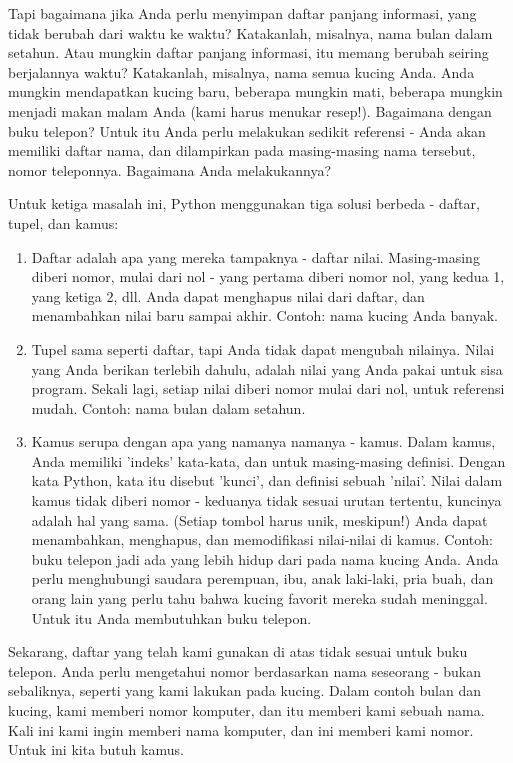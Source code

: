 Tapi bagaimana jika Anda perlu menyimpan daftar panjang informasi, yang tidak berubah dari waktu ke waktu? Katakanlah, misalnya, nama bulan dalam setahun. Atau mungkin daftar panjang informasi, itu memang berubah seiring berjalannya waktu? Katakanlah, misalnya, nama semua kucing Anda. Anda mungkin mendapatkan kucing baru, beberapa mungkin mati, beberapa mungkin menjadi makan malam Anda (kami harus menukar resep!). Bagaimana dengan buku telepon? Untuk itu Anda perlu melakukan sedikit referensi - Anda akan memiliki daftar nama, dan dilampirkan pada masing-masing nama tersebut, nomor teleponnya. Bagaimana Anda melakukannya?

Untuk ketiga masalah ini, Python menggunakan tiga solusi berbeda - daftar, tupel, dan kamus: 
\begin{enumerate}
\item Daftar adalah apa yang mereka tampaknya - daftar nilai. Masing-masing diberi nomor, mulai dari nol - yang pertama diberi nomor nol, yang kedua 1, yang ketiga 2, dll. Anda dapat menghapus nilai dari daftar, dan menambahkan nilai baru sampai akhir. Contoh: nama kucing Anda banyak. 
\item Tupel sama seperti daftar, tapi Anda tidak dapat mengubah nilainya. Nilai yang Anda berikan terlebih dahulu, adalah nilai yang Anda pakai untuk sisa program. Sekali lagi, setiap nilai diberi nomor mulai dari nol, untuk referensi mudah. Contoh: nama bulan dalam setahun. 
\item Kamus serupa dengan apa yang namanya namanya - kamus. Dalam kamus, Anda memiliki 'indeks' kata-kata, dan untuk masing-masing definisi. Dengan kata Python, kata itu disebut 'kunci', dan definisi sebuah 'nilai'. Nilai dalam kamus tidak diberi nomor - keduanya tidak sesuai urutan tertentu, kuncinya adalah hal yang sama. (Setiap tombol harus unik, meskipun!) Anda dapat menambahkan, menghapus, dan memodifikasi nilai-nilai di kamus. Contoh: buku telepon jadi ada yang lebih hidup dari pada nama kucing Anda. Anda perlu menghubungi saudara perempuan, ibu, anak laki-laki, pria buah, dan orang lain yang perlu tahu bahwa kucing favorit mereka sudah meninggal. Untuk itu Anda membutuhkan buku telepon. 
\end{enumerate}
Sekarang, daftar yang telah kami gunakan di atas tidak sesuai untuk buku telepon. Anda perlu mengetahui nomor berdasarkan nama seseorang - bukan sebaliknya, seperti yang kami lakukan pada kucing. Dalam contoh bulan dan kucing, kami memberi nomor komputer, dan itu memberi kami sebuah nama. Kali ini kami ingin memberi nama komputer, dan ini memberi kami nomor. Untuk ini kita butuh kamus.

